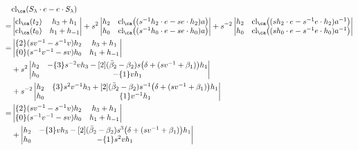 \begin{example}
\begin{align*}
& \textrm{cl}_\ca ( S_\lambda \cdot e - e \cdot S_\lambda ) \\
=&
\begin{vmatrix}
\textrm{cl}_\ca ( t_2 ) &  h_3 + h_1 \\
\textrm{cl}_\ca ( t_0 ) & h_1 + h_{-1}
\end{vmatrix}
+ s^2
\begin{vmatrix}
h_2 & \textrm{cl}_\ca \big( ( s^{-1} h_2 \cdot e - s e \cdot h_2 ) a \big) \\
h_0 & \textrm{cl}_\ca \big( ( s^{-1} h_0 \cdot e - s e \cdot h_0 ) a \big)
\end{vmatrix} 
+ s^{-2}
\begin{vmatrix}
h_2 & \textrm{cl}_\ca \big( ( s h_2 \cdot e - s^{-1} e \cdot h_2 ) a^{-1} \big) \\
h_0 & \textrm{cl}_\ca \big( ( s h_0 \cdot e - s^{-1} e \cdot h_0 ) a^{-1} \big)
\end{vmatrix} \\
=& 
\begin{vmatrix}
\{2\} ( s v^{-1} - s^{-1} v ) h_2 &  h_3 + h_1 \\
\{0\} ( s^{-1} v^{-1} - s v ) h_0 & h_1 + h_{-1}
\end{vmatrix} \\
&+ s^2
\begin{vmatrix}
h_2 & - \{3\} s^{-2} v h_3 - [2] ( \bar{\beta}_2 - \beta_2 ) s \big( \delta + (s v^{-1} + \beta_{1} ) \big) h_1 \\
h_0 & - \{1\} v h_{1}
\end{vmatrix} \\
&+ s^{-2}
\begin{vmatrix}
h_2 & \{3\} s^2 v^{-1} h_{3} + [2] ( \bar{\beta}_2 - \beta_2 ) s^{-1} \big( \delta + ( s v^{-1} + \beta_{1} ) \big) h_{1} \\
h_0 & \{1\} v^{-1} h_{1}
\end{vmatrix} \\
=& 
\begin{vmatrix}
\{2\} ( s v^{-1} - s^{-1} v ) h_2 &  h_3 + h_1 \\
\{0\} ( s^{-1} v^{-1} - s v ) h_0 & h_1 + h_{-1}
\end{vmatrix} \\
&+
\begin{vmatrix}
h_2 & - \{3\} v h_3 - [2] ( \bar{\beta}_2 - \beta_2 ) s^3 \big( \delta + (s v^{-1} + \beta_{1} ) \big) h_1 \\
h_0 & - \{1\} s^2 v h_{1}

\end{vmatrix}
\end{align*}
\end{example}

